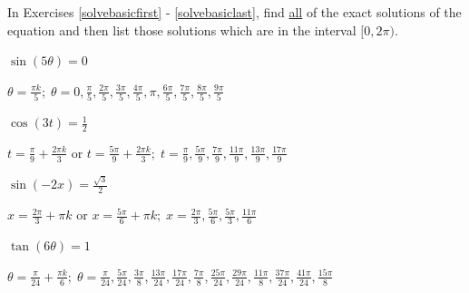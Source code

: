 \documentclass{ximera}
\begin{document}
	\author{Stitz-Zeager}


\begin{question}
In Exercises \ref{solvebasicfirst} - \ref{solvebasiclast}, find \underline{all} of the exact solutions of the  equation and then list those solutions which are in the interval $[0, 2\pi)$.

\begin{problem} \label{solvebasicfirst}
$\sin \left( 5 \theta \right) = 0$ 

\begin{solution}
$\theta = \frac{\pi k}{5}; \; \theta = 0, \frac{\pi}{5}, \frac{2\pi}{5}, \frac{3\pi}{5}, \frac{4\pi}{5}, \pi, \frac{6\pi}{5}, \frac{7\pi}{5}, \frac{8\pi}{5}, \frac{9\pi}{5}$
\end{solution}
\end{problem}

\begin{problem}
$\cos \left( 3t \right) = \frac{1}{2}$

\begin{solution}
$t  = \frac{\pi}{9} + \frac{2\pi k}{3}$ or $t = \frac{5\pi}{9} + \frac{2\pi k}{3}; \; t = \frac{\pi}{9}, \frac{5\pi}{9}, \frac{7\pi}{9}, \frac{11\pi}{9}, \frac{13\pi}{9}, \frac{17\pi}{9}$
\end{solution}
\end{problem}

\begin{problem}
$\sin \left( -2x \right) = \frac{\sqrt{3}}{2}$

\begin{solution}
$x = \frac{2\pi}{3} + \pi k$ or $x = \frac{5\pi}{6} + \pi k; \; x = \frac{2\pi}{3}, \frac{5\pi}{6}, \frac{5\pi}{3}, \frac{11\pi}{6}$
\end{solution}
\end{problem}

\begin{problem}
$\tan \left( 6 \theta \right) = 1$

\begin{solution}
$\theta = \frac{\pi}{24} + \frac{\pi k}{6}; \; \theta = \frac{\pi}{24}, \frac{5\pi}{24}, \frac{3\pi}{8}, \frac{13\pi}{24}, \frac{17\pi}{24}, \frac{7\pi}{8}, \frac{25\pi}{24}, \frac{29\pi}{24}, \frac{11\pi}{8}, \frac{37\pi}{24}, \frac{41\pi}{24}, \frac{15\pi}{8}$
\end{solution}
\end{problem}


\end{question}
\end{document}
